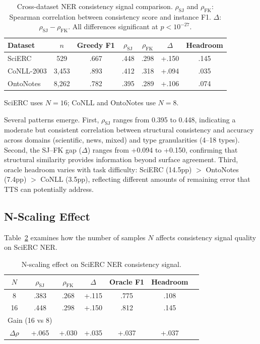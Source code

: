 \documentclass[11pt,a4paper]{article}
\newcommand{\rhosj}{\rho_{\mathrm{SJ}}}
\newcommand{\rhofk}{\rho_{\mathrm{FK}}}
\begin{document}
\begin{table}[t]
\centering
\caption{Cross-dataset NER consistency signal comparison. $\rhosj$ and $\rhofk$: Spearman correlation between consistency score and instance F1. $\Delta$: $\rhosj - \rhofk$. All differences significant at $p < 10^{-27}$.}
\label{tab:cross_dataset}
\small
\begin{tabular}{lcccccc}
\toprule
\textbf{Dataset} & \textbf{$n$} & \textbf{Greedy F1} & \textbf{$\rhosj$} & \textbf{$\rhofk$} & \textbf{$\Delta$} & \textbf{Headroom} \\
\midrule
SciERC      & 529   & .667 & .448 & .298 & +.150 & .145 \\
CoNLL-2003  & 3{,}453 & .893 & .412 & .318 & +.094 & .035 \\
OntoNotes   & 8{,}262 & .782 & .395 & .289 & +.106 & .074 \\
\bottomrule
\end{tabular}
\vspace{0.3em}

{\footnotesize SciERC uses $N\!=\!16$; CoNLL and OntoNotes use $N\!=\!8$.}
\end{table}

Several patterns emerge. First, $\rhosj$ ranges from 0.395 to 0.448, indicating a moderate but consistent correlation between structural consistency and accuracy across domains (scientific, news, mixed) and type granularities (4--18 types). Second, the SJ--FK gap ($\Delta$) ranges from +0.094 to +0.150, confirming that structural similarity provides information beyond surface agreement. Third, oracle headroom varies with task difficulty: SciERC (14.5pp) $>$ OntoNotes (7.4pp) $>$ CoNLL (3.5pp), reflecting different amounts of remaining error that TTS can potentially address.

\subsection{N-Scaling Effect}
\label{sec:n_scaling}

Table~\ref{tab:n_scaling} examines how the number of samples $N$ affects consistency signal quality on SciERC NER.

\begin{table}[t]
\centering
\caption{N-scaling effect on SciERC NER consistency signal.}
\label{tab:n_scaling}
\small
\begin{tabular}{ccccccc}
\toprule
\textbf{$N$} & \textbf{$\rhosj$} & \textbf{$\rhofk$} & \textbf{$\Delta$} & \textbf{Oracle F1} & \textbf{Headroom} \\
\midrule
8  & .383 & .268 & +.115 & .775 & .108 \\
16 & .448 & .298 & +.150 & .812 & .145 \\
\midrule
\multicolumn{2}{l}{Gain (16 vs 8)} & & & & \\
$\Delta\rho$ & +.065 & +.030 & +.035 & +.037 & +.037 \\
\bottomrule
\end{tabular}
\end{table}
\end{document}
